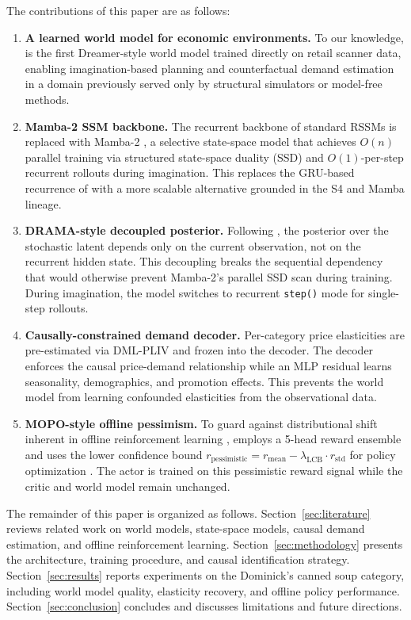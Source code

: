 The contributions of this paper are as follows:

\begin{enumerate}[leftmargin=*]
\item \textbf{A learned world model for economic environments.} To our knowledge, \dreamprice{} is the first Dreamer-style world model trained directly on retail scanner data, enabling imagination-based planning and counterfactual demand estimation in a domain previously served only by structural simulators or model-free methods.

\item \textbf{Mamba-2 SSM backbone.} The recurrent backbone of standard RSSMs is replaced with Mamba-2 \citep{dao2024mamba2}, a selective state-space model that achieves $O(n)$ parallel training via structured state-space duality (SSD) and $O(1)$-per-step recurrent rollouts during imagination. This replaces the GRU-based recurrence of \dreamer{} \citep{hafner2023dreamerv3} with a more scalable alternative grounded in the S4 \citep{gu2022s4} and Mamba \citep{gu2024mamba} lineage.

\item \textbf{DRAMA-style decoupled posterior.} Following \citet{rajbhandari2024drama}, the posterior over the stochastic latent depends only on the current observation, not on the recurrent hidden state. This decoupling breaks the sequential dependency that would otherwise prevent Mamba-2's parallel SSD scan during training. During imagination, the model switches to recurrent \texttt{step()} mode for single-step rollouts.

\item \textbf{Causally-constrained demand decoder.} Per-category price elasticities are pre-estimated via DML-PLIV \citep{chernozhukov2018dml} and frozen into the \dreamprice{} decoder. The decoder enforces the causal price-demand relationship while an MLP residual learns seasonality, demographics, and promotion effects. This prevents the world model from learning confounded elasticities from the observational data.

\item \textbf{MOPO-style offline pessimism.} To guard against distributional shift inherent in offline reinforcement learning \citep{levine2020offline}, \dreamprice{} employs a 5-head reward ensemble and uses the lower confidence bound $r_{\text{pessimistic}} = r_{\text{mean}} - \lambda_{\text{LCB}} \cdot r_{\text{std}}$ for policy optimization \citep{yu2020mopo}. The actor is trained on this pessimistic reward signal while the critic and world model remain unchanged.
\end{enumerate}

The remainder of this paper is organized as follows. Section~\ref{sec:literature} reviews related work on world models, state-space models, causal demand estimation, and offline reinforcement learning. Section~\ref{sec:methodology} presents the \dreamprice{} architecture, training procedure, and causal identification strategy. Section~\ref{sec:results} reports experiments on the Dominick's canned soup category, including world model quality, elasticity recovery, and offline policy performance. Section~\ref{sec:conclusion} concludes and discusses limitations and future directions.
